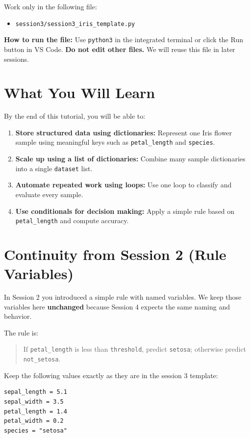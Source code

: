 \begin{tcolorbox}[title=Hands-on file for this session]
Work only in the following file:
\begin{itemize}
    \item \texttt{session3/session3\_iris\_template.py}
\end{itemize}
\textbf{How to run the file:} Use \texttt{python3} in the integrated terminal or click the Run button in VS Code. \textbf{Do not edit other files.} We will reuse this file in later sessions.
\end{tcolorbox}

\section{What You Will Learn}
By the end of this tutorial, you will be able to:
\begin{enumerate}
    \item \textbf{Store structured data using dictionaries:} Represent one Iris flower sample using meaningful keys such as \texttt{petal\_length} and \texttt{species}.
    \item \textbf{Scale up using a list of dictionaries:} Combine many sample dictionaries into a single \texttt{dataset} list.
    \item \textbf{Automate repeated work using loops:} Use one loop to classify and evaluate every sample.
    \item \textbf{Use conditionals for decision making:} Apply a simple rule based on \texttt{petal\_length} and compute accuracy.
\end{enumerate}



\section{Continuity from Session 2 (Rule Variables)}
In Session 2 you introduced a simple rule with named variables. We keep those variables here \textbf{unchanged} because Session 4 expects the same naming and behavior.

The rule is:
\begin{quote}
If \texttt{petal\_length} is less than \texttt{threshold}, predict \texttt{setosa}; otherwise predict \texttt{not\_setosa}.
\end{quote}

Keep the following values exactly as they are in the session 3 template:

\begin{listing}[H]
\caption{Example Iris dataset variables}
\label{lst:iris_variables}
\begin{verbatim}
sepal_length = 5.1
sepal_width = 3.5
petal_length = 1.4
petal_width = 0.2
species = "setosa"
\end{verbatim}
\end{listing}

